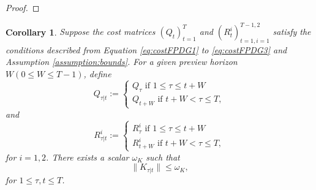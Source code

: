 \documentclass[letterpaper, 10 pt, conference]{ieeeconf}  %
\newcommand{\transpose}{\mathsf{T}}
\newtheorem{corollary}{Corollary}
\begin{document}
\begin{proof}
    
\end{proof}

\begin{corollary}\label{corrolary:boundedK}
    Suppose the cost matrices $(Q_{t})_{t=1}^{T}$ and $(R_{t}^{i})_{t=1,i=1}^{T-1,2}$ satisfy the conditions described from Equation \eqref{eq:costFPDG1} to \eqref{eq:costFPDG3} and Assumption \ref{assumption:bounds}.
    For a given preview horizon $W(0\leq W \leq T-1)$, define
    \begin{equation}
        Q_{\tau|t}:= 
        \begin{cases}
            Q_{\tau} \text{ if $1\leq \tau \leq t+W$}\\
            Q_{t+W} \text{ if $t+W < \tau \leq T$},
        \end{cases}
    \end{equation}
    and
    \begin{equation}
        R_{\tau|t}^{i}:= 
        \begin{cases}
            R_{\tau}^{i} \text{ if $1\leq \tau \leq t+W$}\\
            R_{t+W}^{i} \text{ if $t+W < \tau \leq T$},
        \end{cases}
    \end{equation}
    for $i = {1,2}$.
    There exists a scalar $\omega_{K}$ such that
    \begin{equation*}
        \|K_{\tau|t}\| \leq \omega_{K},
    \end{equation*}
    for $1\leq \tau,t\leq T$.
\end{corollary}
\end{document}
